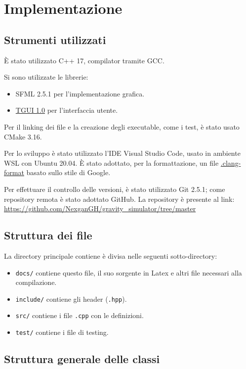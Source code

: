 \documentclass{article}
\begin{document}
\section{Implementazione}
\subsection{Strumenti utilizzati}
È stato utilizzato C++ 17, compilator tramite GCC.

Si sono utilizzate le librerie:
\begin{itemize}
    \item SFML 2.5.1 per l'implementazione grafica.
    \item \href{https://tgui.eu/tutorials/1.0/linux/}{TGUI 1.0} per l'interfaccia utente.
\end{itemize}

Per il linking dei file e la creazione degli executable, come i test, è stato usato CMake 3.16.

Per lo sviluppo è stato utilizzato l'IDE Visual Studio Code, usato in ambiente WSL con Ubuntu 20.04. È stato adottato, per la formattazione, un file \href{https://github.com/NexganGH/gravity_simulator/blob/master/.clang-format}{.clang-format} basato sullo stile di Google.

Per effettuare il controllo delle versioni, è stato utilizzato Git 2.5.1; come repository remota è stato adottato GitHub. La repository è presente al link: \url{https://github.com/NexganGH/gravity_simulator/tree/master}


\subsection{Struttura dei file}
La directory principale contiene è divisa nelle seguenti sotto-directory:
\begin{itemize}
    \item \verb|docs/| contiene questo file, il suo sorgente in Latex e altri file necessari alla compilazione.
    \item \verb|include/| contiene gli header (\verb|.hpp|).
    \item \verb|src/| contiene i file \verb|.cpp| con le definizioni.
    \item \verb|test/| contiene i file di testing.
\end{itemize}

\subsection{Struttura generale delle classi}
\end{document}
